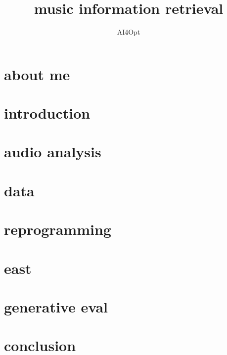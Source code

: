 

\title{music information retrieval}
\subtitle{AI4Opt} 


	

    \section[about]{about me}
        
        
    \section[intro]{introduction}
        
        
    \section{audio analysis}        
		
        
    \section{data}
        
    
    \section{reprogramming}
        
    
    \section{east}
        
    
    \section{generative eval}
        

    \section{conclusion}
        
        



